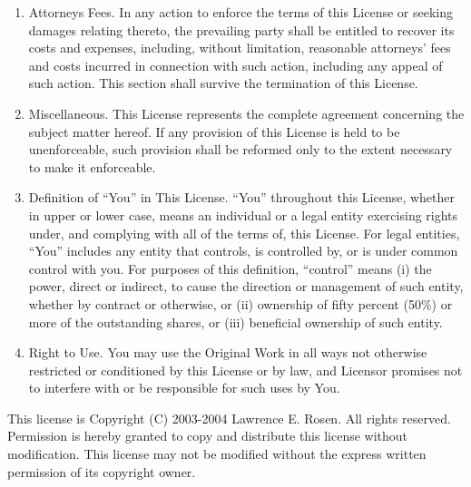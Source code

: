 \begin{small}
\begin{enumerate}[1)]
Jurisdiction, Venue and Governing Law. Any action or suit relating to
this License may be brought only in the courts of a jurisdiction
wherein the Licensor resides or in which Licensor conducts its primary
business, and under the laws of that jurisdiction excluding its
conflict-of-law provisions. The application of the United Nations
Convention on Contracts for the International Sale of Goods is
expressly excluded. Any use of the Original Work outside the scope of
this License or after its termination shall be subject to the
requirements and penalties of the U.S. Copyright Act, 17 U.S.C. \^A\S 101
et seq., the equivalent laws of other countries, and international
treaty. This section shall survive the termination of this License.
\item
Attorneys Fees. In any action to enforce the terms of this License or
seeking damages relating thereto, the prevailing party shall be
entitled to recover its costs and expenses, including, without
limitation, reasonable attorneys' fees and costs incurred in
connection with such action, including any appeal of such action. This
section shall survive the termination of this License.
\item
Miscellaneous. This License represents the complete agreement
concerning the subject matter hereof. If any provision of this License
is held to be unenforceable, such provision shall be reformed only to
the extent necessary to make it enforceable.
\item
Definition of ``You'' in This License. ``You'' throughout this License,
whether in upper or lower case, means an individual or a legal entity
exercising rights under, and complying with all of the terms of, this
License. For legal entities, ``You'' includes any entity that controls,
is controlled by, or is under common control with you. For purposes of
this definition, ``control'' means (i) the power, direct or indirect, to
cause the direction or management of such entity, whether by contract
or otherwise, or (ii) ownership of fifty percent (50\%) or more of the
outstanding shares, or (iii) beneficial ownership of such entity.
\item
Right to Use. You may use the Original Work in all ways not otherwise
restricted or conditioned by this License or by law, and Licensor
promises not to interfere with or be responsible for such uses by
You.
\end{enumerate}

This license is Copyright (C) 2003-2004 Lawrence E. Rosen. All rights
reserved. Permission is hereby granted to copy and distribute this
license without modification. This license may not be modified without
the express written permission of its copyright owner.


\end{small}
